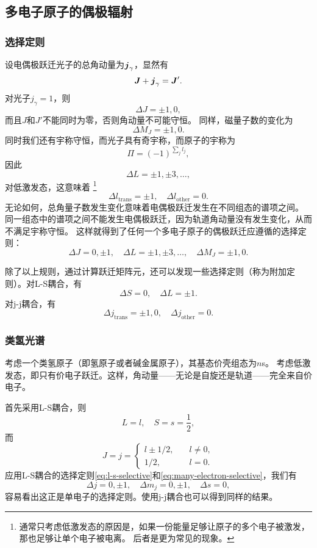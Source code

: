 \documentclass[UTF8, a4paper]{ctexart}
\begin{document}
\subsection{多电子原子的偶极辐射}

\subsubsection{选择定则}

设电偶极跃迁光子的总角动量为$\vb*{j}_\gamma$，显然有
\[
    \vb*{J} + \vb*{j}_\gamma = \vb*{J}'.
\]
对光子$j_\gamma=1$，则
\[
    \Delta J = \pm 1, 0, 
\]
而且$J$和$J'$不能同时为零，否则角动量不可能守恒。
同样，磁量子数的变化为
\[
    \Delta M_J = \pm 1, 0.
\]
同时我们还有宇称守恒，而光子具有奇宇称，而原子的宇称为
\[
    \Pi = (-1)^{\sum_{j} l_j},
\]
因此
\[
    \Delta L = \pm 1, \pm 3, \ldots,
\]
对低激发态，这意味着%
\footnote{通常只考虑低激发态的原因是，如果一份能量足够让原子的多个电子被激发，那也足够让单个电子被电离。
后者是更为常见的现象。}%
\[
    \Delta l_\text{trans} = \pm 1, \quad \Delta l_\text{other} = 0.
\]
无论如何，总角量子数发生变化意味着电偶极跃迁发生在不同组态的谱项之间。
同一组态中的谱项之间不能发生电偶极跃迁，因为轨道角动量没有发生变化，从而不满足宇称守恒。
这样就得到了任何一个多电子原子的偶极跃迁应遵循的选择定则：
\begin{equation}
    \Delta J = 0, \pm 1, \quad \Delta L = \pm 1, \pm 3, \ldots, \quad \Delta M_J = \pm 1, 0.
    \label{eq:many-electron-selective}
\end{equation}

除了以上规则，通过计算跃迁矩阵元，还可以发现一些选择定则（称为附加定则）。对L-S耦合，有
\begin{equation}
    \Delta S = 0, \quad \Delta L = \pm 1.
    \label{eq:l-s-selective}
\end{equation}
对j-j耦合，有
\begin{equation}
    \Delta j_\text{trans} = \pm 1, 0, \quad \Delta j_\text{other} = 0.
    \label{eq:j-j-selective}
\end{equation}

\subsubsection{类氢光谱}

考虑一个类氢原子（即氢原子或者碱金属原子），其基态价壳组态为$n$s。
考虑低激发态，即只有价电子跃迁。这样，角动量——无论是自旋还是轨道——完全来自价电子。

首先采用L-S耦合，则
\[
    L = l, \quad S = s = \frac{1}{2}, 
\]
而
\[
    J = j = \begin{cases}
        l \pm 1/2, &\quad l \neq 0, \\
        1/2, &\quad l = 0.
    \end{cases}
\]
应用L-S耦合的选择定则\eqref{eq:l-s-selective}和\eqref{eq:many-electron-selective}，我们有
\[
    \Delta j = 0, \pm 1, \quad \Delta m_j = 0, \pm 1, \quad \Delta s = 0, 
\]
容易看出这正是单电子的选择定则。使用j-j耦合也可以得到同样的结果。
\end{document}
